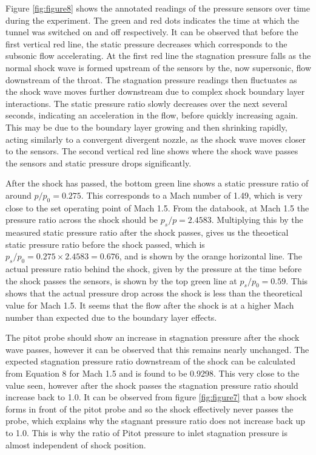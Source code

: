 \documentclass{article}
\begin{document}
Figure \ref{fig:figure8} shows the annotated readings of the pressure sensors over time during the experiment.
The green and red dots indicates the time at which the tunnel was switched on and off respectively.
It can be observed that before the first vertical red line, the static pressure decreases which corresponds to the subsonic flow accelerating.
At the first red line the stagnation pressure falls as the normal shock wave is formed upstream of the sensors by the, now supersonic, flow downstream of the throat.
The stagnation pressure readings then fluctuates as the shock wave moves further downstream due to complex shock boundary layer interactions.
The static pressure ratio slowly decreases over the next several seconds, indicating an acceleration in the flow, before quickly increasing again.
This may be due to the boundary layer growing and then shrinking rapidly, acting similarly to a convergent divergent nozzle, as the shock wave moves closer to the sensors.
The second vertical red line shows where the shock wave passes the sensors and static pressure drops significantly.

After the shock has passed, the bottom green line shows a static pressure ratio of around $p/p_0 = 0.275$. This corresponds to a Mach number of 1.49, which is very close to the set operating point of Mach 1.5.
From the databook, at Mach 1.5 the pressure ratio across the shock should be $p_s/p = 2.4583$.
Multiplying this by the measured static pressure ratio after the shock passes, gives us the theoetical static pressure ratio before the shock passed, which is $p_s/p_0 = 0.275 \times 2.4583 = 0.676$, and is shown by the orange horizontal line.
The actual pressure ratio behind the shock, given by the pressure at the time before the shock passes the sensors, is shown by the top green line at $p_s/p_0 = 0.59$.
This shows that the actual pressure drop across the shock is less than the theoretical value for Mach 1.5.
It seems that the flow after the shock is at a higher Mach number than expected due to the boundary layer effects.

The pitot probe should show an increase in stagnation pressure after the shock wave passes, however it can be observed that this remains nearly unchanged.
The expected stagnation pressure ratio downstream of the shock can be calculated from Equation 8 for Mach 1.5 and is found to be 0.9298. This very close to the value seen, however after the shock passes the stagnation pressure ratio should increase back to 1.0.
It can be observed from figure \ref{fig:figure7} that a bow shock forms in front of the pitot probe and so the shock effectively never passes the probe, which explains why the stagnant pressure ratio does not increase back up to 1.0.
This is why the ratio of Pitot pressure to inlet stagnation pressure is almost independent of shock position.
\end{document}
